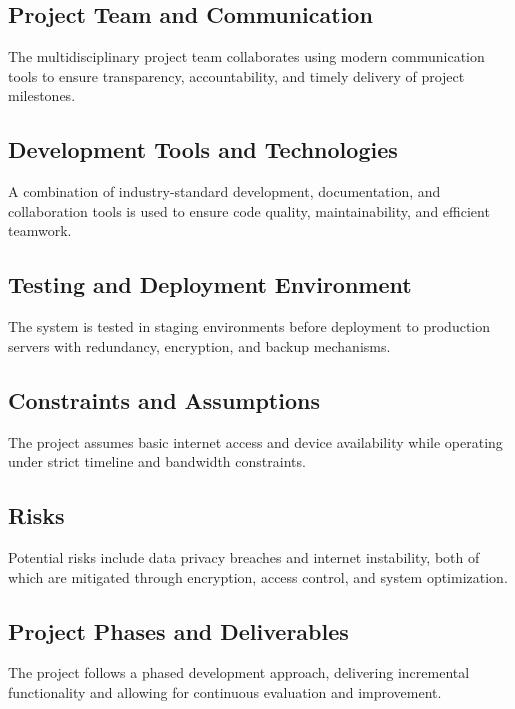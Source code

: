 \documentclass[12pt,a4paper]{report}
\begin{document}
\subsection{Project Team and Communication}
The multidisciplinary project team collaborates using modern communication tools to ensure transparency, accountability, and timely delivery of project milestones.



\subsection{Development Tools and Technologies}
A combination of industry-standard development, documentation, and collaboration tools is used to ensure code quality, maintainability, and efficient teamwork.



\subsection{Testing and Deployment Environment}
The system is tested in staging environments before deployment to production servers with redundancy, encryption, and backup mechanisms.



\subsection{Constraints and Assumptions}
The project assumes basic internet access and device availability while operating under strict timeline and bandwidth constraints.



\subsection{Risks}
Potential risks include data privacy breaches and internet instability, both of which are mitigated through encryption, access control, and system optimization.



\subsection{Project Phases and Deliverables}
The project follows a phased development approach, delivering incremental functionality and allowing for continuous evaluation and improvement.
\end{document}
